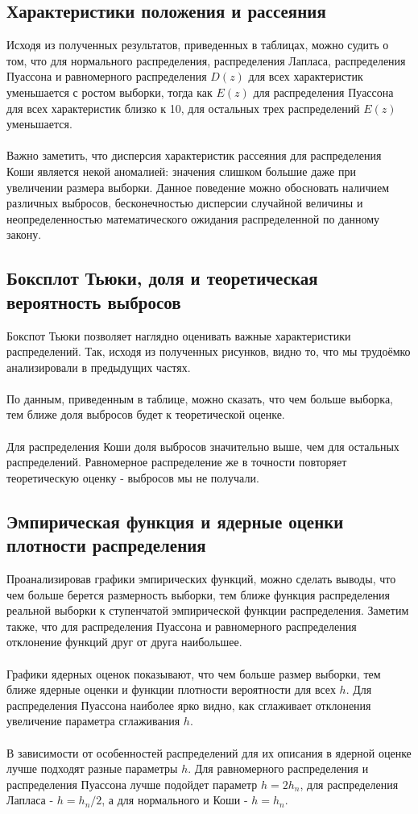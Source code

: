 \documentclass[a4paper,14pt]{article}
\begin{document}
	
	\subsection{Характеристики положения и рассеяния}
	Исходя из полученных результатов, приведенных в таблицах, можно судить о том, что для нормального распределения, распределения Лапласа, распределения Пуассона и равномерного распределения $D(z)$ для всех характеристик уменьшается с ростом выборки, тогда как $E(z)$ для распределения Пуассона для всех характеристик близко к 10, для остальных трех распределений $E(z)$ уменьшается.	
	~\\
	~\\
	Важно заметить, что дисперсия характеристик рассеяния для распределения Коши является некой аномалией: значения слишком большие даже при увеличении размера выборки. Данное поведение можно обосновать наличием различных выбросов, бесконечностью дисперсии случайной величины и неопределенностью математического ожидания распределенной по данному закону.
	
	\subsection{Боксплот Тьюки, доля и теоретическая вероятность выбросов}
	Бокспот Тьюки позволяет наглядно оценивать важные характеристики распределений. Так, исходя из полученных рисунков, видно то, что мы трудоёмко анализировали в предыдущих частях.
		~\\
	~\\
		По данным, приведенным в таблице, можно сказать, что чем больше выборка, тем ближе доля выбросов будет к теоретической оценке. 
		~\\
	~\\
	Для распределения Коши доля выбросов значительно выше, чем для остальных
распределений. Равномерное распределение же в точности повторяет теоретическую оценку - выбросов мы не получали.
	
	\subsection{Эмпирическая функция и ядерные оценки плотности распределения}
	
	Проанализировав графики эмпирических функций, можно сделать выводы, что чем больше берется размерность выборки, тем ближе функция распределения реальной выборки к ступенчатой эмпирической функции распределения. Заметим также, что для распределения Пуассона и равномерного распределения отклонение функций друг от друга наибольшее.
~\\
	~\\
Графики ядерных оценок показывают, что чем больше размер выборки, тем ближе ядерные оценки и функции плотности вероятности для всех $h$. Для распределения Пуассона наиболее ярко видно, как сглаживает отклонения увеличение параметра сглаживания $h$.
~\\
~\\
В зависимости от особенностей распределений для их описания в ядерной оценке лучше подходят разные параметры $h$. Для равномерного распределения и распределения Пуассона лучше подойдет параметр $h= 2h_n$, для распределения Лапласа - $h = h_n/2$, а для нормального и Коши - $h = h_n$. 
\end{document}
